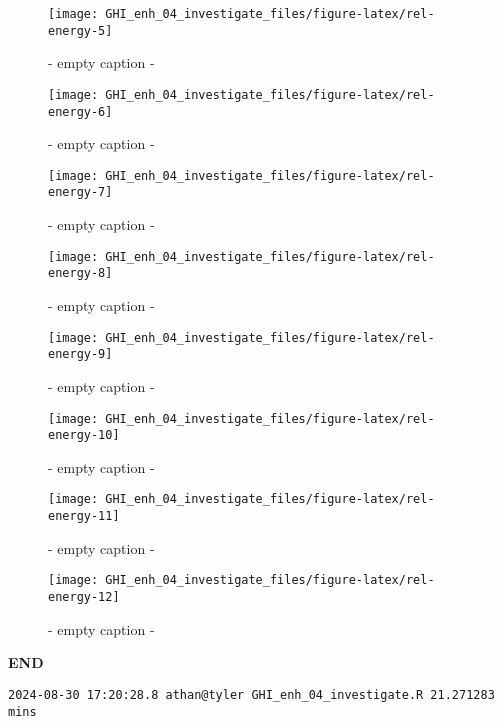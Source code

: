\documentclass[
  10pt,
  a4paper,oneside]{article}
\begin{document}
\begin{figure}[H]

{\centering \texttt{[image: GHI\_enh\_04\_investigate\_files/figure-latex/rel-energy-5]} 

}

\caption{ - empty caption - }\label{fig:rel-energy-5}
\end{figure}
\begin{figure}[H]

{\centering \texttt{[image: GHI\_enh\_04\_investigate\_files/figure-latex/rel-energy-6]} 

}

\caption{ - empty caption - }\label{fig:rel-energy-6}
\end{figure}
\begin{figure}[H]

{\centering \texttt{[image: GHI\_enh\_04\_investigate\_files/figure-latex/rel-energy-7]} 

}

\caption{ - empty caption - }\label{fig:rel-energy-7}
\end{figure}
\begin{figure}[H]

{\centering \texttt{[image: GHI\_enh\_04\_investigate\_files/figure-latex/rel-energy-8]} 

}

\caption{ - empty caption - }\label{fig:rel-energy-8}
\end{figure}
\begin{figure}[H]

{\centering \texttt{[image: GHI\_enh\_04\_investigate\_files/figure-latex/rel-energy-9]} 

}

\caption{ - empty caption - }\label{fig:rel-energy-9}
\end{figure}
\begin{figure}[H]

{\centering \texttt{[image: GHI\_enh\_04\_investigate\_files/figure-latex/rel-energy-10]} 

}

\caption{ - empty caption - }\label{fig:rel-energy-10}
\end{figure}
\begin{figure}[H]

{\centering \texttt{[image: GHI\_enh\_04\_investigate\_files/figure-latex/rel-energy-11]} 

}

\caption{ - empty caption - }\label{fig:rel-energy-11}
\end{figure}
\begin{figure}[H]

{\centering \texttt{[image: GHI\_enh\_04\_investigate\_files/figure-latex/rel-energy-12]} 

}

\caption{ - empty caption - }\label{fig:rel-energy-12}
\end{figure}

\textbf{END}

\begin{verbatim}
2024-08-30 17:20:28.8 athan@tyler GHI_enh_04_investigate.R 21.271283 mins
\end{verbatim}
\end{document}
